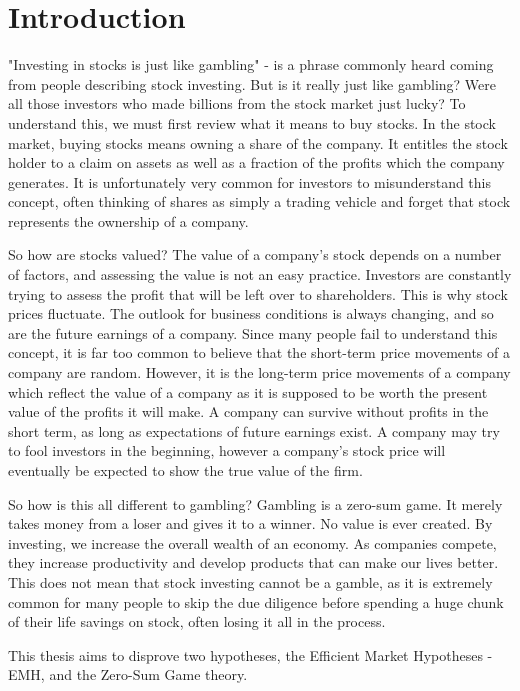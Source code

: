 \chapter{Introduction}

"Investing in stocks is just like gambling" - is a phrase commonly heard coming from people describing stock investing. But is it really just like gambling? Were all those investors who made billions from the stock market just lucky? To understand this, we must first review what it means to buy stocks. In the stock market, buying stocks means owning a share of the company. It entitles the stock holder to a claim on assets as well as a fraction of the profits which the company generates. It is unfortunately very common for investors to misunderstand this concept, often thinking of shares as simply a trading vehicle and forget that stock represents the ownership of a company. 

So how are stocks valued? The value of a company’s stock depends on a number of factors, and assessing the value is not an easy practice. Investors are constantly trying to assess the profit that will be left over to shareholders. This is why stock prices fluctuate. The outlook for business conditions is always changing, and so are the future earnings of a company. Since many people fail to understand this concept, it is far too common to believe that the short-term price movements of a company are random. However, it is the long-term price movements of a company which reflect the value of a company as it is supposed to be worth the present value of the profits it will make. A company can survive without profits in the short term, as long as expectations of future earnings exist. A company may try to fool investors in the beginning, however a company’s stock price will eventually be expected to show the true value of the firm.

So how is this all different to gambling? Gambling is a zero-sum game. It merely takes money from a loser and gives it to a winner. No value is ever created. By investing, we increase the overall wealth of an economy. As companies compete, they increase productivity and develop products that can make our lives better. This does not mean that stock investing cannot be a gamble, as it is extremely common for many people to skip the due diligence before spending a huge chunk of their life savings on stock, often losing it all in the process.

This thesis aims to disprove two hypotheses, the Efficient Market Hypotheses - EMH, and the Zero-Sum Game theory.

